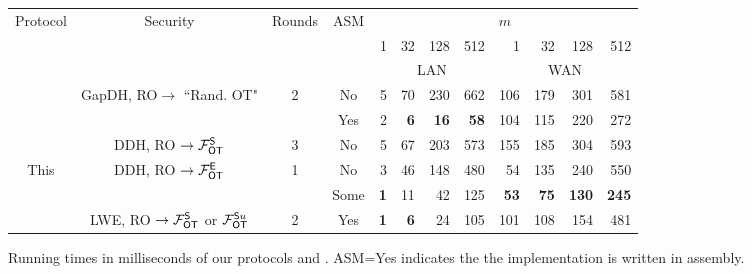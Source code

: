 \begin{figure*}[t!]\centering
	\begin{tabular}{|c||c|c|c || r | r|  r | r |r |r|r |r|}
		\hline
		     \multirow{3}{*}{Protocol}       &              \multirow{3}{*}{Security}              & \multirow{3}{*}{Rounds} & \multirow{3}{*}{ASM} &                              \multicolumn{8}{c|}{$m$}                              \\
		                                     &                                                     &                         &                      & 1      & 32     & 128     & 512      & 1        & 32       &       128 & 512       \\ \cline{5-12}
		                                     &                                                     &                         &                      &       \multicolumn{4}{c|}{LAN}       &          \multicolumn{4}{c|}{WAN}           \\ \hline\hline
		\multirow{2}{*}{ \cite{LC:ChoOrl15}} & \multirow{2}{*}{GapDH, RO$\rightarrow$ ``Rand. OT"} & \multirow{2}{*}{   2 }  &          No          & 5      & 70     & 230     & 662      & 106      & 179      &       301 & 581       \\ \cline{4-12}
		                                     &                                                     &                         &         Yes          & 2      & {\bf6} & {\bf16} & {\bf 58} & 104      & 115      &       220 & {272}     \\ \hline
		        \cite{SODA:NaoPin01}         &           DDH, RO $\rightarrow\mathcal{F}_{\mathsf{OT}}^\mathsf{S}$           &            3            &          No          & 5      & 67     & 203     & 573      & 155      & 185      &       304 & 593       \\ \hline
		       \multirow{3}{*}{ This}        &   \multirow{2}{*}{  DDH, RO $\rightarrow\mathcal{F}_{\mathsf{OT}}^\mathsf{E}$}   &   \multirow{2}{*}{ 1}   &          No          & 3      & 46     & 148     & 480      & {54}     & 135      &       240 & 550       \\ \cline{4-12}
		                                     &                                                     &                         &       Some        & {\bf1} & 11     & 42      & 125      & {\bf 53} & {\bf 75} & {\bf 130} & {\bf 245} \\ \cline{2-12}
		                                     & LWE, RO $\rightarrow\mathcal{F}_{\mathsf{OT}}^\mathsf{S}$ or $\mathcal{F}_{\mathsf{OT}}^{\mathsf{S} u}$ &            2            &         Yes          & {\bf1} & {\bf6} & {24}    & { 105}   & 101      & {108}    &     {154} & 481       \\ \hline
	\end{tabular}
	\caption{ \label{fig:baseTimes}Running times in milliseconds of our protocols and \cite{LC:ChoOrl15,SODA:NaoPin01}. ASM=Yes indicates the the implementation is written in assembly. }	
\end{figure*}



